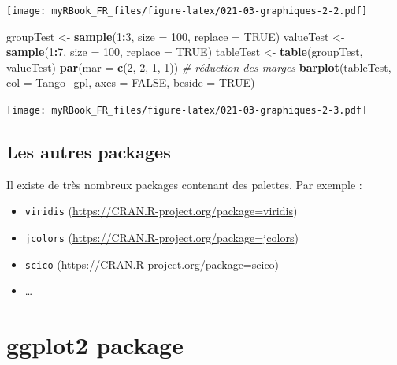 \documentclass[
]{book}
\newenvironment{Shaded}{\begin{snugshade}}{\end{snugshade}}
\newcommand{\CommentTok}[1]{\textcolor[rgb]{0.56,0.35,0.01}{\textit{#1}}}
\newcommand{\DataTypeTok}[1]{\textcolor[rgb]{0.13,0.29,0.53}{#1}}
\newcommand{\DecValTok}[1]{\textcolor[rgb]{0.00,0.00,0.81}{#1}}
\newcommand{\KeywordTok}[1]{\textcolor[rgb]{0.13,0.29,0.53}{\textbf{#1}}}
\newcommand{\NormalTok}[1]{#1}
\newcommand{\OperatorTok}[1]{\textcolor[rgb]{0.81,0.36,0.00}{\textbf{#1}}}
\newcommand{\OtherTok}[1]{\textcolor[rgb]{0.56,0.35,0.01}{#1}}
\newcommand{\StringTok}[1]{\textcolor[rgb]{0.31,0.60,0.02}{#1}}
\providecommand{\tightlist}{%
  \setlength{\itemsep}{0pt}\setlength{\parskip}{0pt}}
\begin{document}
\texttt{[image: myRBook\_FR\_files/figure-latex/021-03-graphiques-2-2.pdf]}

\begin{Shaded}
\begin{Highlighting}[]
\NormalTok{groupTest <-}\StringTok{ }\KeywordTok{sample}\NormalTok{(}\DecValTok{1}\OperatorTok{:}\DecValTok{3}\NormalTok{, }\DataTypeTok{size =} \DecValTok{100}\NormalTok{, }\DataTypeTok{replace =} \OtherTok{TRUE}\NormalTok{) }
\NormalTok{valueTest <-}\StringTok{ }\KeywordTok{sample}\NormalTok{(}\DecValTok{1}\OperatorTok{:}\DecValTok{7}\NormalTok{, }\DataTypeTok{size =} \DecValTok{100}\NormalTok{, }\DataTypeTok{replace =} \OtherTok{TRUE}\NormalTok{)}
\NormalTok{tableTest <-}\StringTok{ }\KeywordTok{table}\NormalTok{(groupTest, valueTest)}
\KeywordTok{par}\NormalTok{(}\DataTypeTok{mar =} \KeywordTok{c}\NormalTok{(}\DecValTok{2}\NormalTok{, }\DecValTok{2}\NormalTok{, }\DecValTok{1}\NormalTok{, }\DecValTok{1}\NormalTok{)) }\CommentTok{# réduction des marges}
\KeywordTok{barplot}\NormalTok{(tableTest, }
  \DataTypeTok{col =}\NormalTok{ Tango_gpl, }\DataTypeTok{axes =} \OtherTok{FALSE}\NormalTok{, }\DataTypeTok{beside =} \OtherTok{TRUE}\NormalTok{)}
\end{Highlighting}
\end{Shaded}

\texttt{[image: myRBook\_FR\_files/figure-latex/021-03-graphiques-2-3.pdf]}

\hypertarget{les-autres-packages}{%
\subsection{Les autres packages}\label{les-autres-packages}}

Il existe de très nombreux packages contenant des palettes. Par exemple :

\begin{itemize}
\tightlist
\item
  \texttt{viridis} (\url{https://CRAN.R-project.org/package=viridis})
\item
  \texttt{jcolors} (\url{https://CRAN.R-project.org/package=jcolors})
\item
  \texttt{scico} (\url{https://CRAN.R-project.org/package=scico})
\item
  \ldots{}
\end{itemize}

\hypertarget{ggplot2-package}{%
\section{ggplot2 package}\label{ggplot2-package}}
\end{document}
